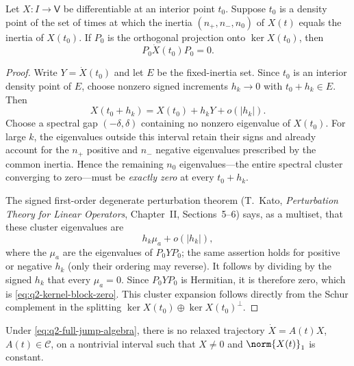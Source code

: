 \documentclass[class=article,11pt,a4paper,crop=false]{standalone}
\begin{document}
\begin{lemma}
\label{lem:q2-fixed-inertia}
Let $X:I\to\mathsf V$ be differentiable at an interior point $t_0$. Suppose
$t_0$ is a density point of the set of times at which the inertia
$(n_+,n_-,n_0)$ of $X(t)$ equals the inertia of $X(t_0)$. If $P_0$ is the
orthogonal projection onto $\ker X(t_0)$, then
\begin{equation}
  P_0\dot X(t_0)P_0=0.
  \label{eq:q2-kernel-block-zero}
\end{equation}
\end{lemma}

\begin{proof}
Write $Y=\dot X(t_0)$ and let $E$ be the fixed-inertia set. Since $t_0$ is an
interior density point of $E$, choose nonzero signed increments $h_k\to0$ with
$t_0+h_k\in E$. Then
\begin{equation}
 X(t_0+h_k)=X(t_0)+h_kY+o(|h_k|).
\end{equation}
Choose a spectral gap $(-\delta,\delta)$ containing no nonzero eigenvalue of
$X(t_0)$. For large $k$, the eigenvalues outside this interval retain their
signs and already account for the $n_+$ positive and $n_-$ negative
eigenvalues prescribed by the common inertia. Hence the remaining $n_0$
eigenvalues---the entire spectral cluster converging to zero---must be
\emph{exactly zero} at every $t_0+h_k$.

The signed first-order degenerate perturbation theorem (T.~Kato,
\emph{Perturbation Theory for Linear Operators}, Chapter~II,
Sections~5--6) says, as a multiset, that these cluster eigenvalues are
\begin{equation}
 h_k\mu_a+o(|h_k|),
\end{equation}
where the $\mu_a$ are the eigenvalues of $P_0YP_0$; the same assertion holds
for positive or negative $h_k$ (only their ordering may reverse). It follows
by dividing by the signed $h_k$ that every $\mu_a=0$. Since $P_0YP_0$ is
Hermitian, it is therefore zero, which is
\eqref{eq:q2-kernel-block-zero}. This cluster expansion follows directly from
the Schur complement in the splitting
$\ker X(t_0)\oplus\ker X(t_0)^\perp$.
\end{proof}

\begin{lemma}
\label{lem:q2-no-constant-trajectory}
Under \eqref{eq:q2-full-jump-algebra}, there is no relaxed trajectory
$\dot X=A(t)X$, $A(t)\in\mathcal C$, on a nontrivial interval such that
$X\ne0$ and $\norm{X(t)}_1$ is constant.
\end{lemma}
\end{document}
